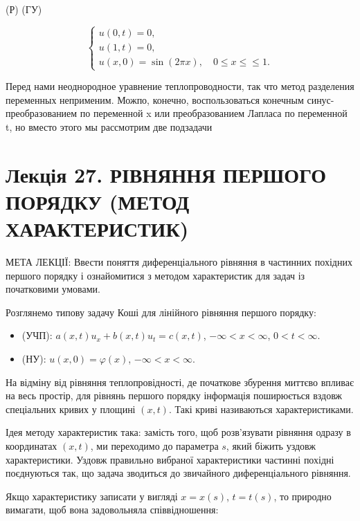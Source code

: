\documentclass[
  ukrainian,
]{article}
\providecommand{\tightlist}{%
  \setlength{\itemsep}{0pt}\setlength{\parskip}{0pt}}
\begin{document}
(Р) (ГУ)

\[
\begin{cases} u(0, t) = 0, \\ u(1, t) = 0, \\ u(x, 0) = \sin(2\pi x), \quad 0 \le x \le \le 1. \end{cases}
\]

Перед нами неоднородное уравнение теплопроводности, так что метод
разделения переменных неприменим. Можпо, конечно, воспользоваться
конечным синус-преобразованием по переменной x или преобразованием
Лапласа по переменной t, но вместо этого мы рассмотрим две подзадачи

\section{Лекція 27. РІВНЯННЯ ПЕРШОГО ПОРЯДКУ (МЕТОД
ХАРАКТЕРИСТИК)}\label{ux43bux435ux43aux446ux456ux44f-27.-ux440ux456ux432ux43dux44fux43dux43dux44f-ux43fux435ux440ux448ux43eux433ux43e-ux43fux43eux440ux44fux434ux43aux443-ux43cux435ux442ux43eux434-ux445ux430ux440ux430ux43aux442ux435ux440ux438ux441ux442ux438ux43a}

МЕТА ЛЕКЦІЇ: Ввести поняття диференціального рівняння в частинних
похідних першого порядку і ознайомитися з методом характеристик для
задач із початковими умовами.

Розглянемо типову задачу Коші для лінійного рівняння першого порядку:

\begin{itemize}
\tightlist
\item
  (УЧП): \(a(x,t)u_x + b(x,t)u_t = c(x,t)\), \(-\infty < x < \infty\),
  \(0 < t < \infty\).
\item
  (НУ): \(u(x,0) = \varphi(x)\), \(-\infty < x < \infty\).
\end{itemize}

На відміну від рівняння теплопровідності, де початкове збурення миттєво
впливає на весь простір, для рівнянь першого порядку інформація
поширюється вздовж спеціальних кривих у площині \((x,t)\). Такі криві
називаються характеристиками.

Ідея методу характеристик така: замість того, щоб розв'язувати рівняння
одразу в координатах \((x,t)\), ми переходимо до параметра \(s\), який
біжить уздовж характеристики. Уздовж правильно вибраної характеристики
частинні похідні поєднуються так, що задача зводиться до звичайного
диференціального рівняння.

Якщо характеристику записати у вигляді \(x=x(s)\), \(t=t(s)\), то
природно вимагати, щоб вона задовольняла співвідношення:
\end{document}
